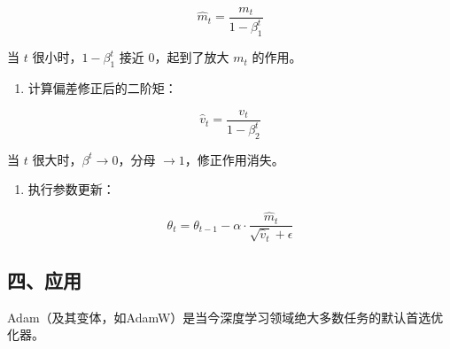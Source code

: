 \[
\hat{m}_t = \frac{m_t}{1-\beta_1^t}
\]

当 \(t\) 很小时，\(1-\beta_1^t\) 接近 \(0\)，起到了放大 \(m_t\) 的作用。

\begin{enumerate}
\def\labelenumi{\arabic{enumi}.}
\setcounter{enumi}{5}
\tightlist
\item
  计算偏差修正后的二阶矩：
\end{enumerate}

\[
\hat{v}_t = \frac{v_t}{1-\beta_2^t}
\]

当 \(t\) 很大时，\(\beta^t \to 0\)，分母 \(\to 1\)，修正作用消失。

\begin{enumerate}
\def\labelenumi{\arabic{enumi}.}
\setcounter{enumi}{6}
\tightlist
\item
  执行参数更新：
\end{enumerate}

\[
\theta_t = \theta_{t-1} - \alpha \cdot \frac{\hat{m}_t}{\sqrt{\hat{v}_t}+\epsilon}
\]

\hypertarget{ux56dbux5e94ux7528}{%
\subsection{四、应用}\label{ux56dbux5e94ux7528}}

Adam（及其变体，如AdamW）是当今深度学习领域绝大多数任务的默认首选优化器。

